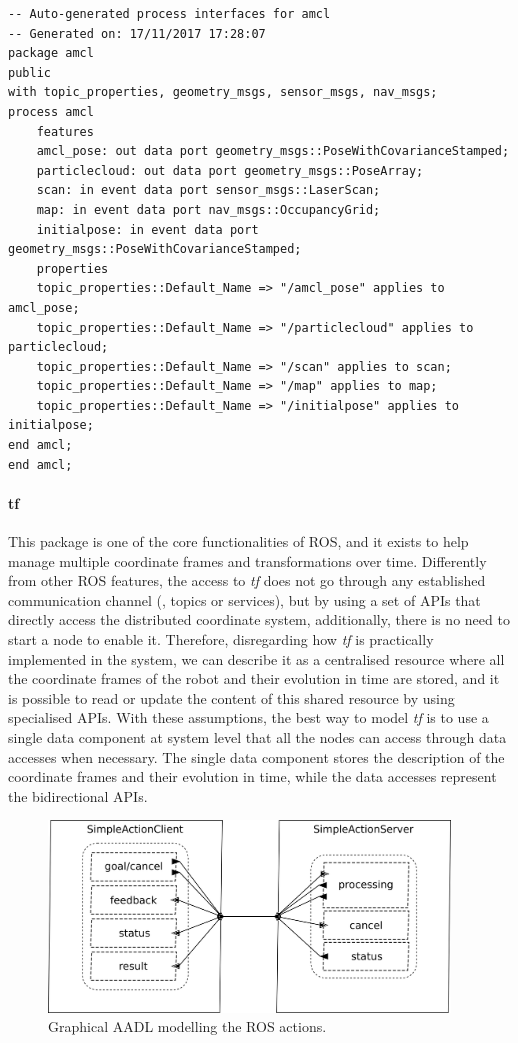 \begin{lstlisting}[language=AADL,caption={Auto-generated AADL to model the amcl package and the amcl node},label=lst:legacy-nodes]
-- Auto-generated process interfaces for amcl
-- Generated on: 17/11/2017 17:28:07
package amcl
public
with topic_properties, geometry_msgs, sensor_msgs, nav_msgs;
process amcl
	features
	amcl_pose: out data port geometry_msgs::PoseWithCovarianceStamped;
	particlecloud: out data port geometry_msgs::PoseArray;
	scan: in event data port sensor_msgs::LaserScan;
	map: in event data port nav_msgs::OccupancyGrid;
	initialpose: in event data port geometry_msgs::PoseWithCovarianceStamped;
	properties
	topic_properties::Default_Name => "/amcl_pose" applies to amcl_pose;
	topic_properties::Default_Name => "/particlecloud" applies to particlecloud;
	topic_properties::Default_Name => "/scan" applies to scan;
	topic_properties::Default_Name => "/map" applies to map;
	topic_properties::Default_Name => "/initialpose" applies to initialpose;
end amcl;
end amcl;	
\end{lstlisting}

\paragraph{tf} This package is one of the core functionalities of ROS, and it exists to help manage multiple coordinate frames and transformations over time. Differently from other ROS features, the access to \textit{tf} does not go through any established communication channel (\ie, topics or services), but by using a set of APIs that directly access the distributed coordinate system, additionally, there is no need to start a node to enable it. Therefore, disregarding how \textit{tf} is practically implemented in the system, we can describe it as a centralised resource where all the coordinate frames of the robot and their evolution in time are stored, and it is possible to read or update the content of this shared resource by using specialised APIs. With these assumptions, the best way to model \textit{tf} is to use a single data component at system level that all the nodes can access through data accesses when necessary. The single data component stores the description of the coordinate frames and their evolution in time, while the data accesses represent the bidirectional APIs.

\begin{figure}[t]
    \centering
    \includegraphics[width=0.95\textwidth]{gfx/action}
    \caption{Graphical AADL modelling the ROS actions.}\label{fig:action}
\end{figure}

